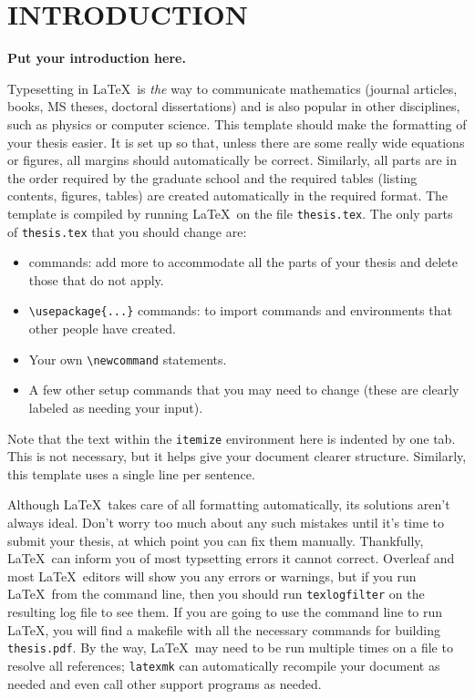 
\chapter{INTRODUCTION}\label{chap1:introduction}

{\bf Put your introduction here.}


Typesetting in \LaTeX \ is {\em the} way to communicate mathematics (journal articles, books, MS theses, doctoral dissertations) and is also popular in other disciplines, such as physics or computer science.
This template should make the formatting of your thesis easier.
It is set up so that, unless there are some really wide equations or figures, all margins should automatically be correct.
Similarly, all parts are in the order required by the graduate school and the required tables (listing contents, figures, tables) are created automatically in the required format. 
The template is compiled by running \LaTeX\ on the file \verb+thesis.tex+.
The only parts of \verb+thesis.tex+ that you should change are:
\begin{itemize}
	\item \verb++ commands: add more to accommodate all the	parts of your thesis and delete those that do not apply.
	\item \verb+\usepackage{...}+ commands: to import commands and environments that other people have created.
	\item Your own \verb+\newcommand+ statements.
	\item A few other setup commands that you may need to change (these are clearly labeled as needing your input).
\end{itemize}
Note that the text within the \verb+itemize+ environment here is indented by one tab.
This is not necessary, but it helps give your document clearer structure.
Similarly, this template uses a single line per sentence.

Although \LaTeX\ takes care of all formatting automatically, its solutions aren't always ideal.
Don't worry too much about any such mistakes until it's time to submit your thesis, at which point you can fix them manually.
Thankfully, \LaTeX\ can inform you of most typsetting errors it cannot correct.
Overleaf and most \LaTeX\ editors will show you any errors or warnings, but if you run \LaTeX\ from the command line, then you should run \verb+texlogfilter+ on the resulting log file to see them.
If you are going to use the command line to run \LaTeX, you will find a makefile with all the necessary commands for building \verb+thesis.pdf+.
By the way, \LaTeX\ may need to be run multiple times on a file to resolve all references; \verb+latexmk+ can automatically recompile your document as needed and even call other support programs as needed.


